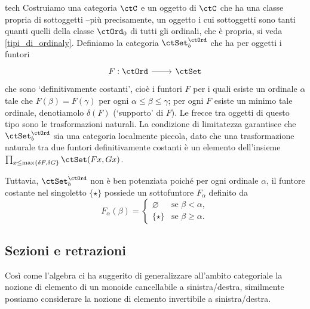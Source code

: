 \begin{hExample}{tech}
	Costruiamo una categoria \(\ctC\) e un oggetto di \(\ctC\) che ha una classe propria di sottoggetti --più precisamente, un oggetto i cui sottoggetti sono tanti quanti quelli della classe \(\ctOrd_0\) di tutti gli ordinali, che è propria, si veda \ref{tipi_di_ordinaly}. Definiamo la categoria \(\ctSet^\ctOrd_b\) che ha per oggetti i funtori
	\[\dmFun{F}{\ctOrd}{\ctSet}\]
	che sono `definitivamente costanti', cioè i funtori \(F\) per i quali esiste un ordinale \(\alpha\) tale che \(F(\beta) = F(\gamma)\) per ogni \(\alpha \leq \beta \leq \gamma\); per ogni \(F\) esiste un minimo tale ordinale, denotiamolo \(\delta(F)\) (`supporto' di \(F\)). Le frecce tra oggetti di questo tipo sono le trasformazioni naturali.
	La condizione di limitatezza garantisce che \(\ctSet^\ctOrd_b\) sia una categoria localmente piccola, dato che una trasformazione naturale tra due funtori definitivamente costanti è un elemento dell'insieme \(\prod_{x\le\max\{\delta F,\delta G\}} \Hom\ctSet(Fx,Gx)\).

	Tuttavia, \(\ctSet^\ctOrd_b\) non è ben potenziata poiché per ogni ordinale \(\alpha\), il funtore costante nel singoletto \(\{\star\}\) possiede un sottofuntore \(F_\alpha\) definito da
	\[
		F_\alpha(\beta)=
		\begin{cases}
			\varnothing & \text{se } \beta<\alpha,    \\
			\{\star\}   & \text{se } \beta\geq\alpha.
		\end{cases}
	\]
\end{hExample}
\subsection{Sezioni e retrazioni}\label{sec_sezretraz}
Così come l'algebra ci ha suggerito di generalizzare all'ambito categoriale la nozione di elemento di un monoide cancellabile a sinistra/destra,
similmente possiamo considerare la nozione di elemento invertibile a sinistra/destra.

